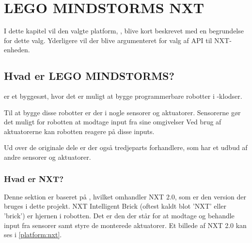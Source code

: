 
\chapter{LEGO MINDSTORMS NXT}
I dette kapitel vil den valgte platform, \legoms, blive kort beskrevet med en begrundelse for dette valg.
Yderligere vil der blive argumenteret for valg af API til NXT-enheden.

\section{Hvad er LEGO MINDSTORMS?}
\legoms er et byggesæt, hvor det er muligt at bygge programmerbare robotter i \lego-klodser.

Til at bygge disse robotter er der i \legoms nogle sensorer og aktuatorer. Sensorerne gør det muligt for robotten at modtage input fra sine omgivelser
Ved brug af aktuatorerne kan robotten reagere på disse inputs.

Ud over de originale \lego dele er der også tredjeparts forhandlere, som har et udbud af andre sensorer og aktuatorer. 

\subsection{Hvad er NXT?}
Denne sektion er baseret på \cite{nxt}, hvilket omhandler NXT 2.0, som er den version der bruges i dette projekt.
NXT Intelligent Brick (oftest kaldt blot 'NXT' eller 'brick') er hjernen i \legoms robotten.
Det er den der står for at modtage og behandle input fra sensorer samt styre de monterede aktuatorer.
Et billede af NXT 2.0 kan ses i \cref{platform:nxt}.

